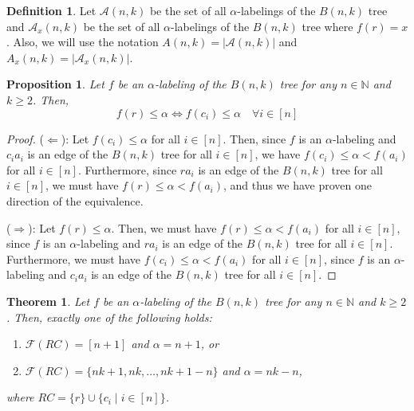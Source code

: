 \documentclass[10pt]{article}
\newtheorem{theorem}{Theorem}
\newtheorem{proposition}{Proposition}
\theoremstyle{definition}
\newtheorem{definition}{Definition}
\begin{document}
\begin{definition}
  Let $\mathcal{A}(n,k)$ be the set of all $\alpha$-labelings of the $B(n,k)$ tree and $\mathcal{A}_x(n,k)$ be the set of all $\alpha$-labelings of the $B(n,k)$ tree where $f(r) = x$. Also, we will use the notation $A(n,k) = |\mathcal{A}(n,k)|$ and $A_x(n,k) = |\mathcal{A}_x(n,k)|$.
\end{definition}

\begin{proposition}
  \label{proposition:RC}
  Let $f$ be an $\alpha$-labeling of the $B(n,k)$ tree for any $n \in \mathbb{N}$ and $k \ge 2$. Then,
  $$
  f(r) \le \alpha \iff f(c_i) \le \alpha \quad \forall i \in [n]
  $$
\end{proposition}

\begin{proof}
  ($\Leftarrow$): Let $f(c_i) \le \alpha$ for all $i \in [n]$. Then, since $f$ is an $\alpha$-labeling and $c_i a_i$ is an edge of the $B(n,k)$ tree for all $i \in [n]$, we have $f(c_i) \le \alpha < f(a_i)$ for all $i \in [n]$. Furthermore, since $r a_i$ is an edge of the $B(n, k)$ tree for all $i \in [n]$, we must have $f(r) \le \alpha < f(a_i)$, and thus we have proven one direction of the equivalence.

  ($\Rightarrow$): Let $f(r) \le \alpha$. Then, we must have $f(r) \le \alpha < f(a_i)$ for all $i \in [n]$, since $f$ is an $\alpha$-labeling and $r a_i$ is an edge of the $B(n, k)$ tree for all $i \in [n]$. Furthermore, we must have $f(c_i) \le \alpha < f(a_i)$ for all $i \in [n]$, since $f$ is an $\alpha$-labeling and $c_i a_i$ is an edge of the $B(n,k)$ tree for all $i \in [n]$.
\end{proof}

\begin{theorem}
  \label{thm:partition}
  Let $f$ be an $\alpha$-labeling of the $B(n,k)$ tree for any $n \in \mathbb{N}$ and $k \ge 2$. Then, exactly one of the following holds:

  \begin{enumerate}
    \item $\mathcal{F}(RC) = [n + 1]$ and $\alpha = n + 1$, or
    \item $\mathcal{F}(RC) = \{nk + 1, nk, \dots, nk + 1 - n\}$ and $\alpha = nk - n$,
  \end{enumerate}

  where $RC = \{r\} \cup \{c_i \mid i \in [n]\}$.
\end{theorem}
\end{document}
